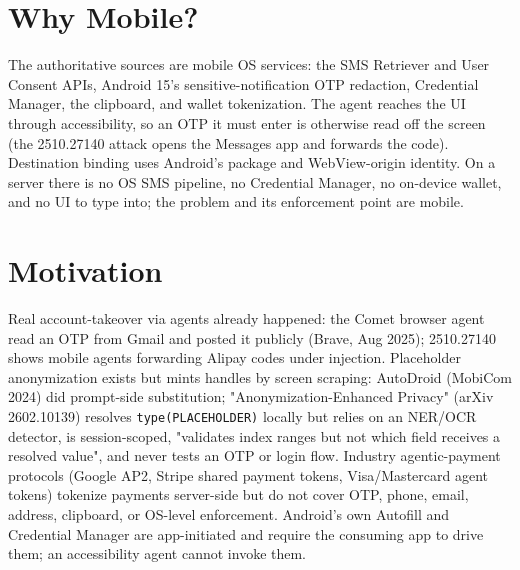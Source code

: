 \documentclass[11pt]{article}
\begin{document}
\section{Why Mobile?}
The authoritative sources are mobile OS services: the SMS Retriever and User Consent APIs, Android 15's sensitive-notification OTP redaction, Credential Manager, the clipboard, and wallet tokenization. The agent reaches the UI through accessibility, so an OTP it must enter is otherwise read off the screen (the 2510.27140 attack opens the Messages app and forwards the code). Destination binding uses Android's package and WebView-origin identity. On a server there is no OS SMS pipeline, no Credential Manager, no on-device wallet, and no UI to type into; the problem and its enforcement point are mobile.

\section{Motivation}
Real account-takeover via agents already happened: the Comet browser agent read an OTP from Gmail and posted it publicly (Brave, Aug 2025); 2510.27140 shows mobile agents forwarding Alipay codes under injection. Placeholder anonymization exists but mints handles by screen scraping: AutoDroid (MobiCom 2024) did prompt-side substitution; "Anonymization-Enhanced Privacy" (arXiv 2602.10139) resolves \texttt{type(PLACEHOLDER)} locally but relies on an NER/OCR detector, is session-scoped, "validates index ranges but not which field receives a resolved value", and never tests an OTP or login flow. Industry agentic-payment protocols (Google AP2, Stripe shared payment tokens, Visa/Mastercard agent tokens) tokenize payments server-side but do not cover OTP, phone, email, address, clipboard, or OS-level enforcement. Android's own Autofill and Credential Manager are app-initiated and require the consuming app to drive them; an accessibility agent cannot invoke them.
\end{document}
